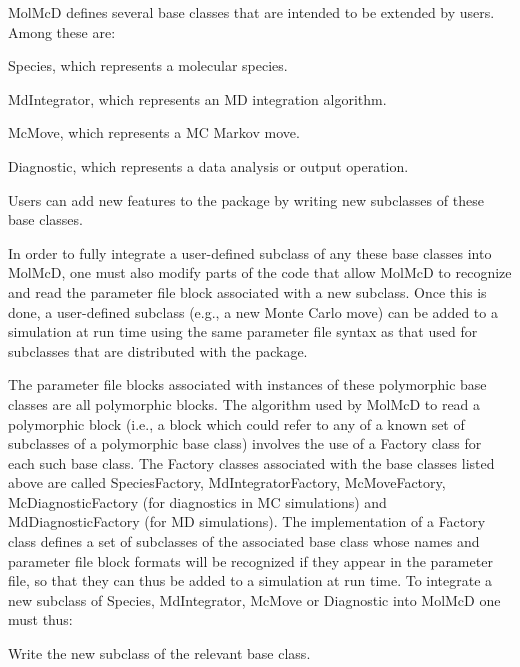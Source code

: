 \-Mol\-Mc\-D defines several base classes that are intended to be extended by users. \-Among these are\-: 
\begin{DoxyItemize}
\item \-Species, which represents a molecular species.  
\item \-Md\-Integrator, which represents an \-M\-D integration algorithm. 
\item \-Mc\-Move, which represents a \-M\-C \-Markov move.  
\item \-Diagnostic, which represents a data analysis or output operation.  
\end{DoxyItemize}\-Users can add new features to the package by writing new subclasses of these base classes.

\-In order to fully integrate a user-\/defined subclass of any these base classes into \-Mol\-Mc\-D, one must also modify parts of the code that allow \-Mol\-Mc\-D to recognize and read the parameter file block associated with a new subclass. \-Once this is done, a user-\/defined subclass (e.\-g., a new \-Monte \-Carlo move) can be added to a simulation at run time using the same parameter file syntax as that used for subclasses that are distributed with the package.

\-The parameter file blocks associated with instances of these polymorphic base classes are all polymorphic blocks. \-The algorithm used by \-Mol\-Mc\-D to read a polymorphic block (i.\-e., a block which could refer to any of a known set of subclasses of a polymorphic base class) involves the use of a \-Factory class for each such base class. \-The \-Factory classes associated with the base classes listed above are called \-Species\-Factory, \-Md\-Integrator\-Factory, \-Mc\-Move\-Factory, \-Mc\-Diagnostic\-Factory (for diagnostics in \-M\-C simulations) and \-Md\-Diagnostic\-Factory (for \-M\-D simulations). \-The implementation of a \-Factory class defines a set of subclasses of the associated base class whose names and parameter file block formats will be recognized if they appear in the parameter file, so that they can thus be added to a simulation at run time. \-To integrate a new subclass of \-Species, \-Md\-Integrator, \-Mc\-Move or \-Diagnostic into \-Mol\-Mc\-D one must thus\-:


\begin{DoxyItemize}
\item \-Write the new subclass of the relevant base class.
\end{DoxyItemize}


